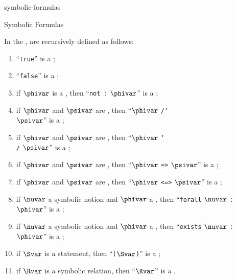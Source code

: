 \documentclass{stex}
\begin{document}
\begin{smodule}{symbolic-formulas}


\ifinputref\else{}\fi

\begin{sfragment}[id=sec:symbolic-formulas]{Symbolic Formulas}
  \begin{sparagraph}[style=symdoc]
    In the \asciidialect,  are recursively defined as follows:
    \begin{enumerate}
      \item ``\texttt{true}'' is a ;
      \item ``\texttt{false}'' is a ;
      \item if $\phivar$ is a ,
        then ``\texttt{not :} $\phivar$'' is a ;
      \item if $\phivar$ and $\psivar$ are ,
        then ``$\phivar$ \texttt{/\char`\\} $\psivar$'' is a ;
      \item if $\phivar$ and $\psivar$ are ,
        then ``$\phivar$ \texttt{\char`\\/} $\psivar$'' is a ;
      \item if $\phivar$ and $\psivar$ are ,
        then ``$\phivar$ \texttt{=>} $\psivar$'' is a ;
      \item if $\phivar$ and $\psivar$ are ,
        then ``$\phivar$ \texttt{<=>} $\psivar$'' is a ;
      \item if $\nuvar$ a symbolic notion and $\phivar$ a ,
        then ``\texttt{forall} $\nuvar$ \texttt: $\phivar$'' is a ;
      \item if $\nuvar$ a symbolic notion and $\phivar$ a ,
        then ``\texttt{exists} $\nuvar$ \texttt: $\phivar$'' is a ;
      \item if $\Svar$ is a statement,
        then ``\texttt($\Svar$\texttt)'' is a ;
      \item if $\Rvar$ is a symbolic relation,
        then ``$\Rvar$'' is a .
    \end{enumerate}


\end{sparagraph}
\end{sfragment}
\end{smodule}
\end{document}
